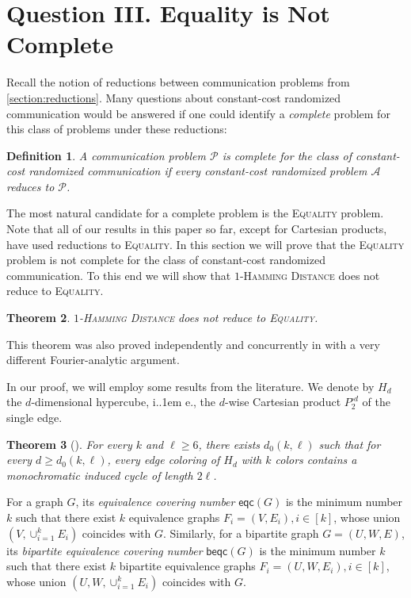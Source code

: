 \documentclass{article}
\makeatletter
\newtheorem{theorem}{Theorem}\newtheorem{lemma}[theorem]{Lemma}\newtheorem{proposition}[theorem]{Proposition}\newtheorem{corollary}[theorem]{Corollary}\newtheorem{definition}[theorem]{Definition}\newtheorem{claim}[theorem]{Claim}\newtheorem{remark}[theorem]{Remark}\newtheorem{observation}[theorem]{Observation}\newtheorem{conjecture}[theorem]{Conjecture}\newtheorem{example}[theorem]{Example}
\newcommand{\cA}{\ensuremath{\mathcal{A}}}
\newcommand{\cP}{\ensuremath{\mathcal{P}}}
\newcommand{\eqc}{\mathsf{eqc}}
\newcommand{\beqc}{\mathsf{beqc}}
\newcommand*\ie{i.\kern.1em e.\@\xspace} %
\newcommand*\EQUALITY{\textsc{Equality}\xspace}
\makeatother
\begin{document}
\section{Question III. Equality is Not Complete}
\label{section:equality}

Recall the notion of reductions between communication problems from \cref{section:reductions}.
Many questions about constant-cost randomized communication would be answered if one could identify
a \emph{complete} problem for this class of problems under these reductions:

\begin{definition}
A communication problem $\cP$ is \emph{complete} for the class of constant-cost randomized
communication if every constant-cost randomized problem $\cA$ reduces to $\cP$.
\end{definition}

The most natural candidate for a complete problem is the \EQUALITY problem. Note that all of our
results in this paper so far, except for Cartesian products, have used reductions to \EQUALITY.  In
this section we will prove that the \EQUALITY problem is not complete for the class of constant-cost
randomized communication.  To this end we will show that \textsc{$1$-Hamming Distance} does not
reduce to \EQUALITY. 


\begin{theorem}
\label{thm:1hd-to-eq}
  \textsc{$1$-Hamming Distance} does not reduce to \textsc{Equality}.
\end{theorem}


This theorem was also proved independently and concurrently in \cite{HHH23dimfree} with a very
different Fourier-analytic argument.

In our proof, we will employ some results from the literature.  We denote by $H_d$ the
$d$-dimensional hypercube, \ie, the $d$-wise Cartesian product $P_2^{\square d}$ of the single edge. 

\begin{theorem}[\cite{ARSV06}]\label{hypercubeColoring}
	For every $k$ and $\ell \geq 6$, there exists $d_0(k,\ell)$ such that 
	for every $d \geq d_0(k,\ell)$, every edge coloring of $H_d$ with $k$
	colors contains a monochromatic \emph{induced}  cycle of length $2 \ell$.
\end{theorem}

For a graph $G$, its \emph{equivalence covering number} $\eqc(G)$ is the minimum number $k$ such that there exist $k$ equivalence graphs $F_i=(V,E_i), i \in [k]$, whose union $(V, \cup_{i=1}^k E_i)$ coincides with $G$.
Similarly, for a bipartite graph $G=(U,W,E)$,
its \emph{bipartite equivalence covering number}
$\beqc(G)$ is the minimum number $k$ such that there exist $k$ bipartite equivalence graphs $F_i=(U,W,E_i), i \in [k]$, whose union $(U,W, \cup_{i=1}^k E_i)$ coincides with $G$.
\end{document}
